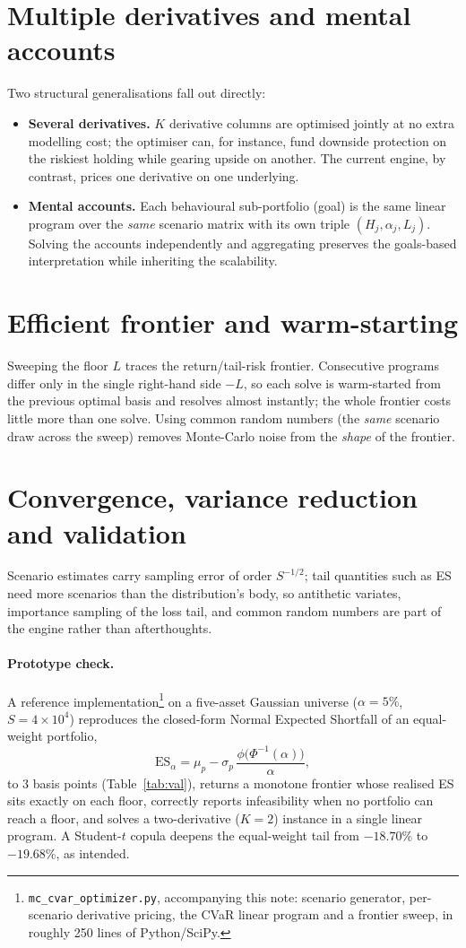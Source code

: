 \documentclass[11pt]{article}
\begin{document}
\section{Multiple derivatives and mental accounts}
Two structural generalisations fall out directly:
\begin{itemize}[leftmargin=1.4em,itemsep=2pt]
\item \textbf{Several derivatives.} $K$ derivative columns are optimised jointly at
no extra modelling cost; the optimiser can, for instance, fund downside protection
on the riskiest holding while gearing upside on another. The current engine, by
contrast, prices one derivative on one underlying.
\item \textbf{Mental accounts.} Each behavioural sub-portfolio (goal) is the same
linear program over the \emph{same} scenario matrix with its own triple
$(H_j,\alpha_j,L_j)$. Solving the accounts independently and aggregating preserves
the goals-based interpretation while inheriting the scalability.
\end{itemize}

\section{Efficient frontier and warm-starting}
Sweeping the floor $L$ traces the return/tail-risk frontier. Consecutive programs
differ only in the single right-hand side $-L$, so each solve is warm-started from
the previous optimal basis and resolves almost instantly; the whole frontier costs
little more than one solve. Using common random numbers (the \emph{same} scenario
draw across the sweep) removes Monte-Carlo noise from the \emph{shape} of the
frontier.

\section{Convergence, variance reduction and validation}
Scenario estimates carry sampling error of order $S^{-1/2}$; tail quantities such as
ES need more scenarios than the distribution's body, so antithetic variates,
importance sampling of the loss tail, and common random numbers are part of the
engine rather than afterthoughts.

\paragraph{Prototype check.} A reference implementation\footnote{\texttt{mc\_cvar\_optimizer.py},
accompanying this note: scenario generator, per-scenario derivative pricing, the
CVaR linear program and a frontier sweep, in roughly 250 lines of Python/SciPy.}
on a five-asset Gaussian universe ($\alpha=5\%$, $S=4\times10^{4}$) reproduces the
closed-form Normal Expected Shortfall of an equal-weight portfolio,
\[
   \mathrm{ES}_\alpha = \mu_p - \sigma_p\,\frac{\phi\!\big(\Phi^{-1}(\alpha)\big)}{\alpha},
\]
to $3$ basis points (Table~\ref{tab:val}), returns a monotone frontier whose
realised ES sits exactly on each floor, correctly reports infeasibility when no
portfolio can reach a floor, and solves a two-derivative ($K{=}2$) instance in a
single linear program. A Student-$t$ copula deepens the equal-weight tail from
$-18.70\%$ to $-19.68\%$, as intended.
\end{document}

